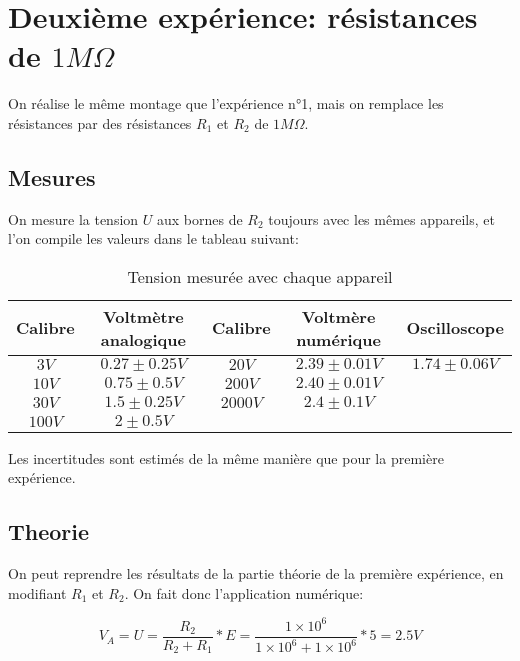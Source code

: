 \documentclass[10pt]{article}
\begin{document}
\section{Deuxième expérience: résistances de $1M \Omega$}
On réalise le même montage que l'expérience n°1, mais on remplace les résistances par des résistances $R_1$ et $R_2$ de $1M\Omega$.

\subsection{Mesures}
On mesure la tension $U$ aux bornes de $R_2$ toujours avec les mêmes appareils, et l'on compile les valeurs dans le tableau suivant:

\begin{table}[h!]
    \begin{center}
        \begin{tabular}{|c|c||c|c||c|}
            \hline
            Calibre & Voltmètre analogique & Calibre & Voltmère numérique & Oscilloscope \\
            \hline
            $3V$ & $0.27 \pm 0.25V$ & $20V$ & $2.39 \pm 0.01V$ & $1.74 \pm 0.06V$ \\
            $10V$ & $0.75 \pm 0.5V$ & $200V$ & $2.40 \pm 0.01V$ &  \\
            $30V$ & $1.5 \pm 0.25V$ & $2000V$ & $2.4 \pm 0.1V$ &  \\
            $100V$ & $2 \pm 0.5V$ & & & \\
            \hline
        \end{tabular}
        \caption{Tension mesurée avec chaque appareil}
        \label{table:table2}
    \end{center}
\end{table}

Les incertitudes sont estimés de la même manière que pour la première expérience.

\subsection{Theorie}
On peut reprendre les résultats de la partie théorie de la première expérience, en modifiant $R_1$ et $R_2$. On fait donc 
l'application numérique:

\begin{equation}
    V_A = U = \frac{R_2}{R_2 + R_1} * E = \frac{1 \times 10^6}{1 \times 10^6 + 1 \times 10^6} * 5 = 2.5V
\end{equation}
\end{document}
